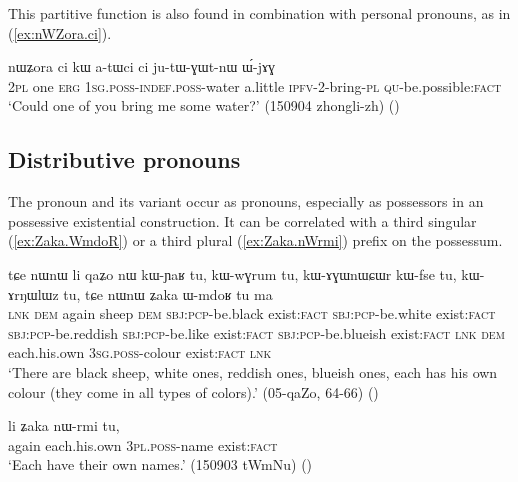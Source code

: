 This partitive function is also found in combination with personal pronouns, as in (\ref{ex:nWZora.ci}).

\begin{exe}
\ex \label{ex:nWZora.ci}
\gll nɯʑora ci kɯ a-tɯci ci ju-tɯ-ɣɯt-nɯ ɯ́-jɤɣ \\
\textsc{2pl} one \textsc{erg} \textsc{1sg}.\textsc{poss}-\textsc{indef}.\textsc{poss}-water a.little \textsc{ipfv}-2-bring-\textsc{pl} \textsc{qu}-be.possible:\textsc{fact} \\
\glt `Could one of you bring me some water?' (150904 zhongli-zh)
()
\end{exe}

\subsection{Distributive pronouns} \label{sec:distributive.pronouns}
The pronoun  and its variant  occur as pronouns, especially as possessors in an possessive existential construction. It can be correlated with a third singular  (\ref{ex:Zaka.WmdoR}) or a third plural  (\ref{ex:Zaka.nWrmi}) prefix on the possessum.


\begin{exe}
\ex \label{ex:Zaka.WmdoR}
\gll tɕe nɯnɯ li qaʑo nɯ kɯ-ɲaʁ tu, kɯ-wɣrum tu, kɯ-ɤɣɯnɯɕɯr kɯ-fse tu, kɯ-ɤrŋɯlɯz tu, tɕe nɯnɯ ʑaka ɯ-mdoʁ tu ma \\
\textsc{lnk} \textsc{dem} again sheep \textsc{dem} \textsc{sbj}:\textsc{pcp}-be.black exist:\textsc{fact} \textsc{sbj}:\textsc{pcp}-be.white exist:\textsc{fact} \textsc{sbj}:\textsc{pcp}-be.reddish \textsc{sbj}:\textsc{pcp}-be.like exist:\textsc{fact}  \textsc{sbj}:\textsc{pcp}-be.blueish exist:\textsc{fact} \textsc{lnk} \textsc{dem} each.his.own \textsc{3sg}.\textsc{poss}-colour  exist:\textsc{fact} \textsc{lnk} \\
\glt `There are black sheep, white ones, reddish ones, blueish ones, each has his own colour (they come in all types of colors).' (05-qaZo, 64-66) ()
\end{exe}

\begin{exe}
\ex \label{ex:Zaka.nWrmi}
\gll li ʑaka nɯ-rmi tu, \\
again each.his.own \textsc{3pl}.\textsc{poss}-name exist:\textsc{fact} \\
\glt `Each have their own names.' (150903 tWmNu) ()
\end{exe}

